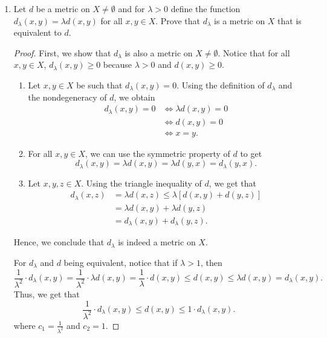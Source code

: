 \documentclass[a4paper]{article}
\begin{document}
\begin{problem}
\begin{enumerate}
\begin{proof}
            \end{proof}
        \item[(ii)] Let \( d  \) be a metric on \( X \neq \emptyset  \) and for \( \lambda > 0  \) define the function \( {d}_{\lambda}(x,y) = \lambda d(x,y) \) for all \( x,y \in X   \). Prove that \( {d}_{\lambda}  \) is a metric on \( X  \) that is equivalent to \( d  \). 
            \begin{proof}
            First, we show that \( {d}_{\lambda} \) is also a metric on \( X \neq \emptyset \). Notice that for all \( x,y \in X  \), \( {d}_{\lambda}(x,y) \geq 0 \) because \( \lambda > 0  \) and \( d(x,y) \geq 0  \).
            \begin{enumerate}
                \item[(i)] Let \( x,y \in X  \) be such that \( {d}_{\lambda}(x,y) = 0  \). Using the definition of \( {d}_{\lambda}  \) and the nondegeneracy of \( d \), we obtain
                    \begin{align*}
                        {d}_{\lambda}(x,y) = 0 &\iff \lambda d(x,y) = 0  \\
                                               &\iff d(x,y) = 0  \\                    
                                               &\iff x = y.  
                    \end{align*}
                \item[(ii)] For all \( x,y \in X  \), we can use the symmetric property of \( d  \) to get 
                    \[  {d}_{\lambda}(x,y) = \lambda d(x,y) = \lambda d(y,x) = {d}_{\lambda}(y,x). \]
                \item[(iii)] Let \( x,y,z \in X  \). Using the triangle inequality of \( d  \), we get that 
                    \begin{align*}
                        {d}_{\lambda}(x,z) &= \lambda d(x,z) \leq \lambda [d(x,y) + d(y,z)] \\
                                           &= \lambda d(x,y) + \lambda d(y,z) \\
                                           &= {d}_{\lambda}(x,y) + {d}_{\lambda}(y,z).
                    \end{align*}
            \end{enumerate}
            Hence, we conclude that \( {d}_{\lambda} \) is indeed a metric on \( X  \).

            For \( {d}_{\lambda}  \) and \( d  \) being equivalent, notice that if \( \lambda > 1  \), then
            \[  \frac{ 1 }{ \lambda^{2} } \cdot  {d}_{\lambda}(x,y) = \frac{ 1 }{ \lambda^{2} } \cdot \lambda d(x,y) = \frac{ 1 }{ \lambda } \cdot  d(x,y) \leq d(x,y) \leq \lambda d(x,y) = {d}_{\lambda}(x,y). \]
            Thus, we get that 
            \[  \frac{ 1 }{ \lambda^{2} } \cdot  {d}_{\lambda}(x,y) \leq d(x,y) \leq 1 \cdot {d}_{\lambda}(x,y). \]
            where \( {c}_{1} = \frac{ 1 }{ \lambda^{2} }   \) and \( {c}_{2} = 1  \).


\end{proof}
\end{enumerate}
\end{problem}
\end{document}
